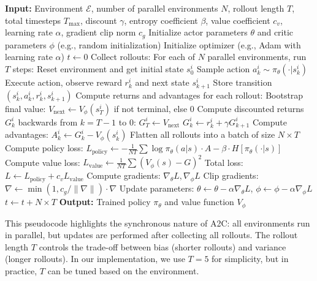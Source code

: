 \documentclass[11pt]{article}
\begin{document}
\begin{algorithm}[H]
\caption{Advantage Actor-Critic (A2C) Algorithm}
\label{alg:a2c}
\begin{algorithmic}[1]
\State \textbf{Input:} Environment $\mathcal{E}$, number of parallel environments $N$, rollout length $T$, total timesteps $T_{\text{max}}$, discount $\gamma$, entropy coefficient $\beta$, value coefficient $c_v$, learning rate $\alpha$, gradient clip norm $c_g$
\State Initialize actor parameters $\theta$ and critic parameters $\phi$ (e.g., random initialization)
\State Initialize optimizer (e.g., Adam with learning rate $\alpha$)
\State $t \gets 0$  
  \State Collect rollouts: For each of $N$ parallel environments, run $T$ steps:
    \State Reset environment and get initial state $s_0^i$
      \State Sample action $a_k^i \sim \pi_\theta(\cdot | s_k^i)$
      \State Execute action, observe reward $r_k^i$ and next state $s_{k+1}^i$
      \State Store transition $(s_k^i, a_k^i, r_k^i, s_{k+1}^i)$
    \EndFor
  \EndFor
  \State Compute returns and advantages for each rollout:
    \State Bootstrap final value: $V_{\text{next}} \gets V_\phi(s_T^i)$ if not terminal, else 0
    \State Compute discounted returns $G_k^i$ backwards from $k=T-1$ to 0:
    \State $G_T^i \gets V_{\text{next}}$
      \State $G_k^i \gets r_k^i + \gamma G_{k+1}^i$
    \EndFor
    \State Compute advantages: $A_k^i \gets G_k^i - V_\phi(s_k^i)$
  \EndFor
  \State Flatten all rollouts into a batch of size $N \times T$
  \State Compute policy loss: $L_{\text{policy}} \gets -\frac{1}{N T} \sum \log \pi_\theta(a | s) \cdot A - \beta \cdot H[\pi_\theta(\cdot | s)]$
  \State Compute value loss: $L_{\text{value}} \gets \frac{1}{N T} \sum (V_\phi(s) - G)^2$
  \State Total loss: $L \gets L_{\text{policy}} + c_v L_{\text{value}}$
  \State Compute gradients: $\nabla_\theta L, \nabla_\phi L$
  \State Clip gradients: $\nabla \gets \min(1, c_g / \|\nabla\|) \cdot \nabla$
  \State Update parameters: $\theta \gets \theta - \alpha \nabla_\theta L$, $\phi \gets \phi - \alpha \nabla_\phi L$
  \State $t \gets t + N \times T$
\EndWhile
\State \textbf{Output:} Trained policy $\pi_\theta$ and value function $V_\phi$
\end{algorithmic}
\end{algorithm}

This pseudocode highlights the synchronous nature of A2C: all environments run in parallel, but updates are performed after collecting all rollouts. The rollout length $T$ controls the trade-off between bias (shorter rollouts) and variance (longer rollouts). In our implementation, we use $T=5$ for simplicity, but in practice, $T$ can be tuned based on the environment.
\end{document}
